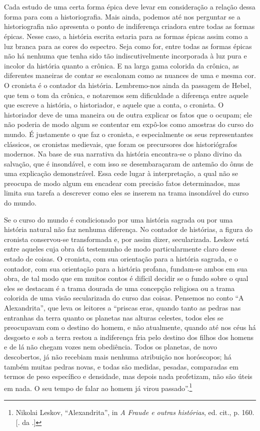 \section{}

Cada estudo de uma certa forma épica deve levar em consideração a
relação dessa forma para com a historiografia. Mais ainda, podemos até
nos perguntar se a historiografia não apresenta o ponto de indiferença
criadora entre todas as formas épicas. Nesse caso, a história escrita
estaria para as formas épicas assim como a luz branca para as cores do
espectro. Seja como for, entre todas as formas épicas não há nenhuma que
tenha sido tão indiscutivelmente incorporada à luz pura e incolor da
história quanto a crônica. E na larga gama colorida da crônica, as
diferentes maneiras de contar se escalonam como as nuances de uma e
mesma cor. O cronista é o contador da história. Lembremo-nos ainda da
passagem de Hebel, que tem o tom da crônica, e notaremos sem dificuldade
a diferença entre aquele que escreve a história, o historiador, e aquele
que a conta, o cronista. O historiador deve de uma maneira ou de outra
explicar os fatos que o ocupam; ele não poderia de modo algum se
contentar em expô-los como amostras do curso do mundo. É justamente o
que faz o cronista, e especialmente os seus representantes clássicos, os
cronistas medievais, que foram os precursores dos historiógrafos
modernos. Na base de sua narrativa da história encontra-se o plano
divino da salvação, que é insondável, e com isso se desembaraçaram de
antemão do ônus de uma explicação demonstrável. Essa cede lugar à
interpretação, a qual não se preocupa de modo algum em encadear com
precisão fatos determinados, mas limita sua tarefa a descrever como
eles se inserem na trama insondável do curso do mundo.

Se o curso do mundo é condicionado por uma história sagrada ou por uma
história natural não faz nenhuma diferença. No contador de histórias, a
figura do cronista conservou-se transformada e, por assim dizer,
secularizada. Leskov está entre aqueles cuja obra dá testemunho de modo
particularmente claro desse estado de coisas. O cronista, com sua
orientação para a história sagrada, e o contador, com sua orientação
para a história profana, fundam-se ambos em sua obra, de tal modo que em
muitos contos é difícil decidir se o fundo sobre o qual eles se
destacam é a trama dourada de uma concepção religiosa ou a trama
colorida de uma visão secularizada do curso das coisas. Pensemos no
conto ``A Alexandrita'', que leva os leitores a ``priscas eras, quando
tanto as pedras nas entranhas da terra quanto os planetas nas alturas
celestes, todos eles se preocupavam com o destino do homem, e não
atualmente, quando até nos céus há desgosto e sob a terra restou a
indiferença fria pelo destino dos filhos dos homens e de lá não chegam
vozes nem obediência. Todos os planetas, de novo descobertos, já não
recebiam mais nenhuma atribuição nos horóscopos; há também muitas pedras
novas, e todas são medidas, pesadas, comparadas em termos de peso
específico e densidade, mas depois nada profetizam, não são úteis em
nada. O seu tempo de falar ao homem já virou passado''.\footnote{Nikolai
  Leskov, ``Alexandrita'', in \emph{A Fraude e outras histórias}, ed.
  cit., p. 160. [. da .]}


